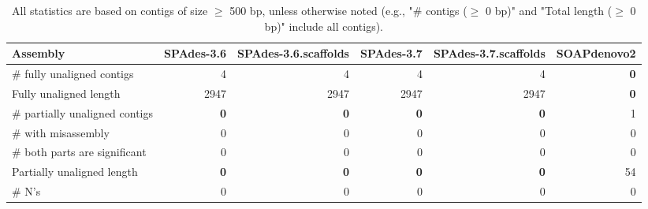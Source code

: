 \documentclass[12pt,a4paper]{article}
\begin{document}
\begin{table}[ht]
\begin{center}
\caption{All statistics are based on contigs of size $\geq$ 500 bp, unless otherwise noted (e.g., "\# contigs ($\geq$ 0 bp)" and "Total length ($\geq$ 0 bp)" include all contigs).}
\begin{tabular}{|l*{5}{|r}|}
\hline
Assembly & SPAdes-3.6 & SPAdes-3.6.scaffolds & SPAdes-3.7 & SPAdes-3.7.scaffolds & SOAPdenovo2 \\ \hline
\# fully unaligned contigs & 4 & 4 & 4 & 4 & {\bf 0} \\ \hline
Fully unaligned length & 2947 & 2947 & 2947 & 2947 & {\bf 0} \\ \hline
\# partially unaligned contigs & {\bf 0} & {\bf 0} & {\bf 0} & {\bf 0} & 1 \\ \hline
\hspace{5mm}\# with misassembly & 0 & 0 & 0 & 0 & 0 \\ \hline
\hspace{5mm}\# both parts are significant & 0 & 0 & 0 & 0 & 0 \\ \hline
Partially unaligned length & {\bf 0} & {\bf 0} & {\bf 0} & {\bf 0} & 54 \\ \hline
\# N's & 0 & 0 & 0 & 0 & 0 \\ \hline
\end{tabular}
\end{center}
\end{table}
\end{document}
